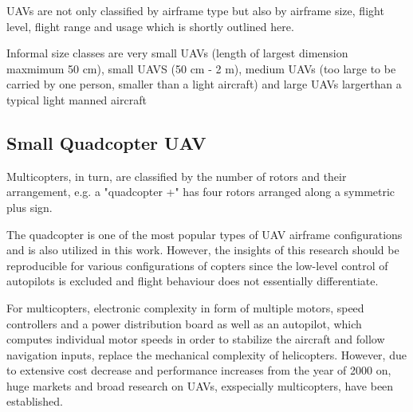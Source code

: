 UAVs are not only classified by airframe type
but also by airframe size, flight level, flight range and usage
which is shortly outlined here. \cite{Austin2011}

Informal size classes are
very small UAVs (length of largest dimension maxmimum 50 cm),
small UAVS (50 cm - 2 m),
medium UAVs (too large to be carried by one person, smaller than a light aircraft)
and large UAVs largerthan a typical light manned aircraft 


\subsection{Small Quadcopter UAV}

Multicopters, in turn, are classified by the number
of rotors and their arrangement, e.g. a "quadcopter +" has four rotors
arranged along a symmetric plus sign.

The quadcopter is one of the most popular types of
UAV airframe configurations and is also utilized
in this work. However, the insights of this
research should be reproducible for various configurations
of copters since the low-level control
of autopilots is excluded and flight behaviour
does not essentially differentiate.

For multicopters,
electronic complexity in form of multiple motors,
speed controllers and a power distribution board
as well as an autopilot,
which computes individual motor speeds in order to
stabilize the aircraft and follow navigation inputs,
replace the mechanical complexity of
helicopters. 
However, due to extensive cost decrease
and performance increases from the year of 2000 on,
huge markets and broad research on UAVs, exspecially multicopters,
have been established.











